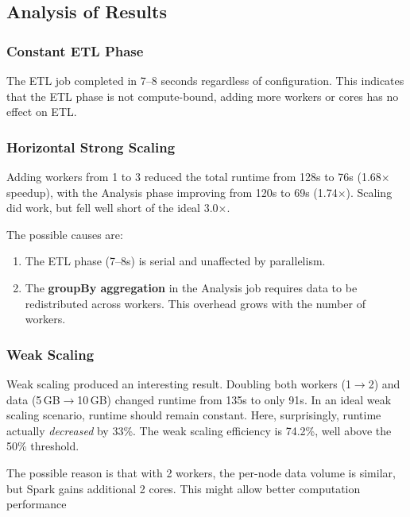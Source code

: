 \subsection{Analysis of Results}

\subsubsection{Constant ETL Phase}

The ETL job completed in 7--8 seconds regardless of configuration. This indicates that the ETL phase is not compute-bound, adding more workers or cores has no effect on ETL. 

\subsubsection{Horizontal Strong Scaling}

Adding workers from 1 to 3 reduced the total runtime from 128s to 76s (1.68$\times$ speedup), with the Analysis phase improving from 120s to 69s (1.74$\times$). Scaling did work, but fell well short of the ideal 3.0$\times$.

The possible causes are:
\begin{enumerate}
    \item The ETL phase (7--8s) is serial and unaffected by parallelism. 
    \item The \textbf{groupBy aggregation} in the Analysis job requires data to be redistributed across workers. This overhead grows with the number of workers.
\end{enumerate}

\subsubsection{Weak Scaling}

Weak scaling produced an interesting result. Doubling both workers (1$\to$2) and data (5\,GB$\to$10\,GB) changed runtime from 135s to only 91s. In an ideal weak scaling scenario, runtime should remain constant. Here, surprisingly, runtime actually \textit{decreased} by 33\%. The weak scaling efficiency is 74.2\%, well above the 50\% threshold.

The possible reason is that with 2 workers, the per-node data volume is similar, but Spark gains additional 2 cores. This might allow better computation performance
